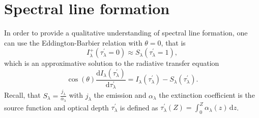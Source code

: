 \documentclass[a4paper,11pt]{report}
\def\lk#1{{\color{black}{#1}}}
\begin{document}

\section{Spectral line formation}
In order to provide a qualitative understanding of spectral line formation, one can use the Eddington-Barbier relation with $\theta = 0$, that is \begin{equation}
I_\lambda^+(\tau_\lambda^\prime = 0) \approx S_\lambda(\tau_\lambda^\prime = 1),
\end{equation} which is an approximative solution to the radiative transfer equation \begin{equation}
\cos(\theta)\frac{\mathrm{d}I_\lambda(\tau_\lambda^\prime)}{\mathrm{d}\tau_\lambda^\prime} = I_\lambda(\tau_\lambda^\prime) - S_\lambda(\tau_\lambda^\prime).
\end{equation} Recall, that $S_\lambda = \frac{j_\lambda}{\alpha_\lambda}$ with $j_\lambda$ the emission and $\alpha_\lambda$ the extinction coefficient is the source function and \lk{that the} optical depth $\tau_\lambda^\prime$ is defined as $\tau_\lambda^\prime(Z)  = \int_{0}^{Z}\alpha_\lambda(z)\,\mathrm{d}z$.
\end{document}
